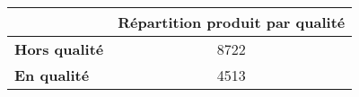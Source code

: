 \begin{tabular}{lc}
\toprule
{} &  Répartition produit par qualité \\
\midrule
\textbf{Hors qualité} &                             8722 \\
\textbf{En qualité  } &                             4513 \\
\bottomrule
\end{tabular}
